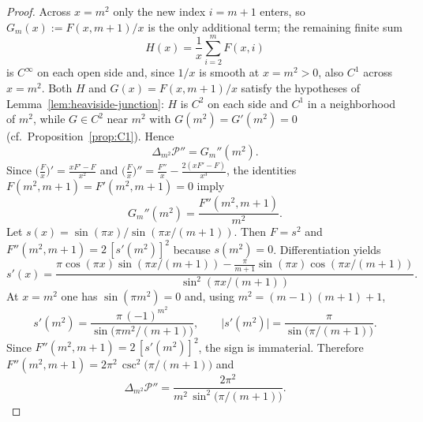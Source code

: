 \documentclass[10pt,a4paper]{amsart}
\begin{document}
\begin{proof}
Across $x=m^2$ only the new index $i=m{+}1$ enters, so $G_m(x):=F(x,m{+}1)/x$ is the only additional term; the remaining finite sum
\[
H(x)=\frac{1}{x}\sum_{i=2}^{m}F(x,i)
\]
is $C^\infty$ on each open side and, since $1/x$ is smooth at $x=m^2>0$, also $C^1$ across $x=m^2$. Both $H$ and $G(x)=F(x,m{+}1)/x$ satisfy the hypotheses of Lemma~\ref{lem:heaviside-junction}: $H$ is $C^2$ on each side and $C^1$ in a neighborhood of $m^2$, while $G\in C^2$ near $m^2$ with $G(m^2)=G'(m^2)=0$ (cf.\ Proposition~\ref{prop:C1}). Hence
\[
\Delta_{m^2}\mathcal P''=G_m''(m^2).
\]
Since $\bigl(\tfrac{F}{x}\bigr)'=\frac{xF'-F}{x^2}$ and $\bigl(\tfrac{F}{x}\bigr)''=\frac{F''}{x}-\frac{2(xF'-F)}{x^3}$, the identities $F(m^2,m{+}1)=F'(m^2,m{+}1)=0$ imply
\[
G_m''(m^2)=\frac{F''(m^2,m{+}1)}{m^2}.
\]
Let $s(x)=\sin(\pi x)/\sin(\pi x/(m{+}1))$. Then $F=s^2$ and $F''(m^2,m{+}1)=2\,[s'(m^2)]^2$ because $s(m^2)=0$. Differentiation yields
\[
s'(x)=\frac{\pi\cos(\pi x)\sin(\pi x/(m{+}1))-\frac{\pi}{m{+}1}\sin(\pi x)\cos(\pi x/(m{+}1))}{\sin^2(\pi x/(m{+}1))}.
\]
At $x=m^2$ one has $\sin(\pi m^2)=0$ and, using $m^2=(m-1)(m{+}1)+1$,
\[
s'(m^2)=\frac{\pi\,(-1)^{m^2}}{\sin\!\bigl(\pi m^2/(m{+}1)\bigr)},
\qquad
\bigl|s'(m^2)\bigr|=\frac{\pi}{\sin\!\bigl(\pi/(m{+}1)\bigr)}.
\]
Since $F''(m^2,m{+}1)=2\,[s'(m^2)]^2$, the sign is immaterial.
Therefore $F''(m^2,m{+}1)=2\pi^2\,\csc^2\!\bigl(\pi/(m{+}1)\bigr)$ and
\[
\Delta_{m^2}\mathcal P''=\frac{2\pi^2}{m^2\,\sin^2\!\bigl(\pi/(m{+}1)\bigr)}.
\]
\end{proof}
\end{document}

